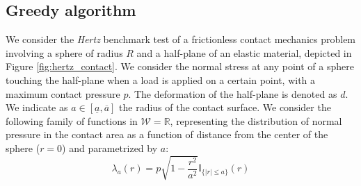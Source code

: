 \subsection{Greedy algorithm}
We consider the \textit{Hertz} benchmark test of a frictionless contact mechanics problem involving a sphere of radius $R$ and a half-plane of an elastic material, depicted in Figure \ref{fig:hertz_contact}. We consider the normal stress at any point of a sphere touching the half-plane when a load is applied on a certain point, with a maximum
contact pressure $p$. The deformation of the half-plane is denoted as $d$.
We indicate as $a \in [\underline{a}, \overline{a}]$ the radius of the contact surface. We consider the following family of functions in $\mathcal{W}=\mathbb{R}$, representing the distribution of normal pressure in the contact area as a function of distance from the center of the sphere ($r=0$) and parametrized by $a$:
\begin{equation*}
\lambda_a(r)=p\sqrt{1 -\frac{r^2}{a^2}} \mathbb{I}_{\{|r| \leq a\}}(r)
    \label{eq:pressure_profile}
\end{equation*}
